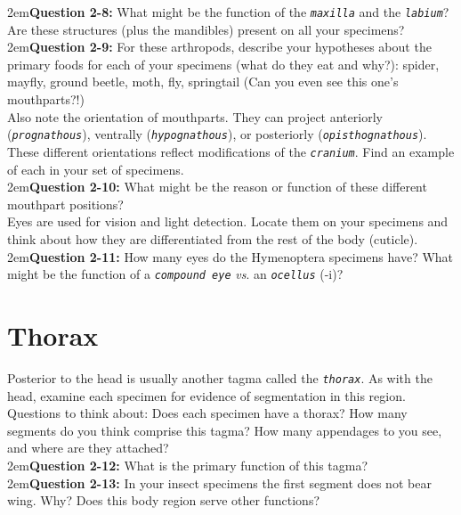 \documentclass[letterpaper, 11pt]{article}
\newcommand{\latinword}[1]{\texttt{\itshape #1}}%
\begin{document}
\hangindent2em\textbf{Question 2-8:} What might be the function of the \latinword{maxilla} and the \latinword{labium}? Are these structures (plus the mandibles) present on all your specimens?\\

\hangindent2em\textbf{Question 2-9:} For these arthropods,  describe your hypotheses about the primary foods for each of your specimens (what do they eat and why?): spider, mayfly, ground beetle, moth, fly, springtail (Can you even see this one's mouthparts?!)\\

\noindent{}Also note the orientation of mouthparts. They can project anteriorly (\latinword{prognathous}), ventrally (\latinword{hypognathous}), or posteriorly (\latinword{opisthognathous}). These different orientations reflect modifications of the \latinword{cranium}. Find an example of each in your set of specimens. \\

\hangindent2em\textbf{Question 2-10:} What might be the reason or function of these different mouthpart positions?\\

\noindent{}Eyes are used for vision and light detection. Locate them on your specimens and think about how they are differentiated from the rest of the body (cuticle).\\

\hangindent2em\textbf{Question 2-11:} How many eyes do the Hymenoptera specimens have? What might be the function of a \latinword{compound eye} \textit{vs}. an \latinword{ocellus} (-i)?\\

\section{Thorax}
Posterior to the head is usually another tagma called the  \latinword{thorax}. As with the head, examine each specimen for evidence of segmentation in this region. Questions to think about: Does each specimen have a thorax? How many segments do you think comprise this tagma? How many appendages to you see, and where are they attached?\\

\hangindent2em\textbf{Question 2-12:} What is the primary function of this tagma? \\

\hangindent2em\textbf{Question 2-13:} In your insect specimens the first segment does not bear wing. Why? Does this body region serve other functions?\\
\end{document}
